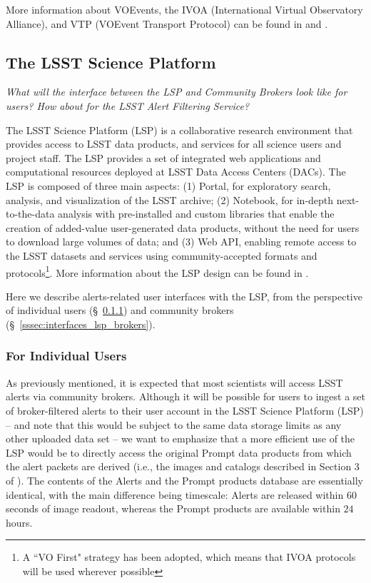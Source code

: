 \smallskip

More information about VOEvents, the IVOA (International Virtual Observatory Alliance), and VTP (VOEvent Transport Protocol) can be found in \citet{2011ivoa.spec.0711S} and \citet{2017arXiv170901264A}.


\subsection{The LSST Science Platform}\label{ssec:interfaces_lsp}
{\it What will the interface between the LSP and Community Brokers look like for users? How about for the LSST Alert Filtering Service?}

\smallskip

The LSST Science Platform (LSP) is a collaborative research environment that provides access to LSST data products, and services for all science users and project staff. The LSP provides a set of integrated web applications and computational resources deployed at LSST Data Access Centers (DACs). The LSP is composed of three main aspects: (1) Portal, for exploratory search, analysis, and visualization of the LSST archive; (2) Notebook, for in-depth next-to-the-data analysis with pre-installed and custom libraries that enable the creation of added-value user-generated data products, without the need for users to download large volumes of data; and (3) Web API, enabling remote access to the LSST datasets and services using community-accepted formats and protocols\footnote{A ``VO First" strategy has been adopted, which means that IVOA protocols will be used wherever possible}. More information about the LSP design can be found in \citet{LSE-319,LDM-542}.

Here we describe alerts-related user interfaces with the LSP, from the perspective of individual users (\S~\ref{sssec:interfaces_lsp_individual}) and community brokers (\S~\ref{sssec:interfaces_lsp_brokers}).

\subsubsection{For Individual Users}\label{sssec:interfaces_lsp_individual}

As previously mentioned, it is expected that most scientists will access LSST alerts via community brokers. Although it will be possible for users to ingest a set of broker-filtered alerts to their user account in the LSST Science Platform (LSP) -- and note that this would be subject to the same data storage limits as any other uploaded data set -- we want to emphasize that a more efficient use of the LSP would be to directly access the original Prompt data products from which the alert packets are derived (i.e., the images and catalogs described in Section 3 of \citealt{LSE-163}). The contents of the Alerts and the Prompt products database are essentially identical, with the main difference being timescale: Alerts are released within $60$ seconds of image readout, whereas the Prompt products are available within $24$ hours.

